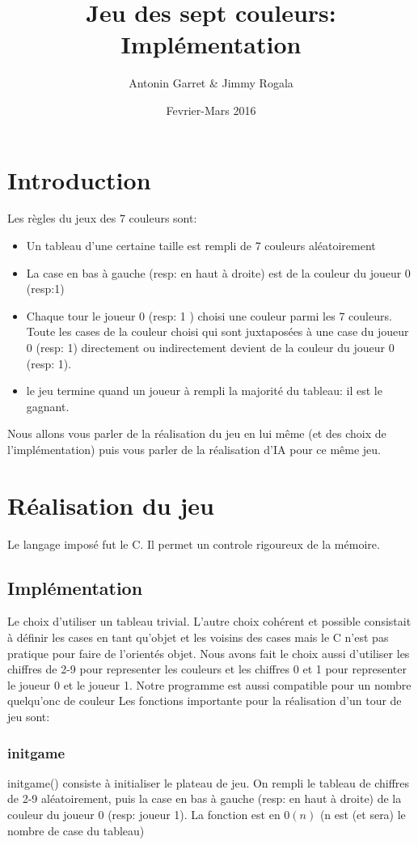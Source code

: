 \documentclass[11pt]{article}
\title{Jeu des sept couleurs: Implémentation}
\author{Antonin Garret & Jimmy Rogala}
\date{Fevrier-Mars 2016}
\begin{document}
  \maketitle
  \section*{Introduction}
    Les règles du jeux des 7 couleurs sont:
    \begin{itemize} %
      \item Un tableau d'une certaine taille est rempli de 7 couleurs aléatoirement
      \item La case en bas à gauche (resp: en haut à droite) est de la couleur du joueur 0 (resp:1)
      \item Chaque tour le joueur 0 (resp: 1 ) choisi une couleur parmi les 7 couleurs. Toute les cases de la couleur choisi qui sont juxtaposées à une case du joueur 0 (resp: 1) directement ou indirectement devient de la couleur du joueur 0 (resp: 1).
      \item le jeu termine quand un joueur à rempli la majorité du tableau: il est le gagnant.
    \end{itemize}
    Nous allons vous parler de la réalisation du jeu en lui même (et des choix de l'implémentation) puis vous parler de la réalisation d'IA pour ce même jeu.
  \section{Réalisation du jeu}
    Le langage imposé fut le C. Il permet un controle rigoureux de la mémoire.
    \subsection{Implémentation}
      Le choix d'utiliser un tableau trivial. L'autre choix cohérent et possible consistait à définir les cases en tant qu'objet et les voisins des cases mais le C n'est pas pratique pour faire de l'orientés objet.
      Nous avons fait le choix aussi d'utiliser les chiffres de 2-9 pour representer les couleurs et les chiffres 0 et 1 pour representer le joueur 0 et le joueur 1. Notre programme est aussi compatible pour un nombre quelqu'onc de couleur
      Les fonctions importante pour la réalisation d'un tour de jeu sont:
      \subsubsection{initgame}
        initgame() consiste à initialiser le plateau de jeu. On rempli le tableau de chiffres de 2-9 aléatoirement, puis la case en bas à gauche (resp: en haut à droite) de la couleur du joueur 0 (resp: joueur 1). La fonction est en $0(n)$ (n est (et sera) le nombre de case du tableau)
\end{document}
